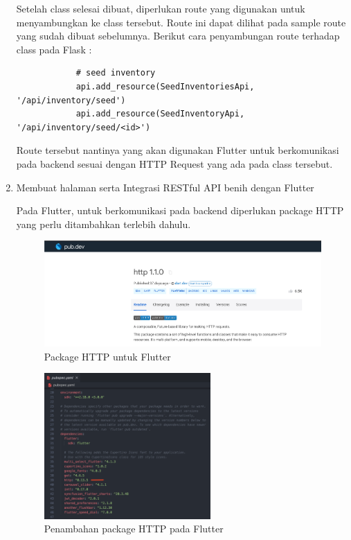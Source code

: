 \begin{spacing}{1.5}
\begin{enumerate}
		Setelah class selesai dibuat, diperlukan route yang digunakan untuk menyambungkan ke class tersebut. Route ini dapat dilihat pada sample route yang sudah dibuat sebelumnya. Berikut cara penyambungan route terhadap class pada Flask :

		\begin{lstlisting}
			# seed inventory
			api.add_resource(SeedInventoriesApi, '/api/inventory/seed')
			api.add_resource(SeedInventoryApi, '/api/inventory/seed/<id>')
		\end{lstlisting}

		Route tersebut nantinya yang akan digunakan Flutter untuk berkomunikasi pada backend sesuai dengan HTTP Request yang ada pada class tersebut.

		\item Membuat halaman serta Integrasi RESTful API benih dengan Flutter
		
		Pada Flutter, untuk berkomunikasi pada backend diperlukan package HTTP yang perlu ditambahkan terlebih dahulu.
		
		\begin{figure}[H]
			\centering
			\includegraphics[width=1\textwidth]{gambar/sprint3/http_pub.png}
			\caption{Package HTTP untuk Flutter}
		\end{figure}

		\begin{figure}[H]
			\centering
			\includegraphics[width=0.6\textwidth]{gambar/sprint3/pubspec_http.png}
			\caption{Penambahan package HTTP pada Flutter}
		\end{figure}


\end{enumerate}
\end{spacing}
